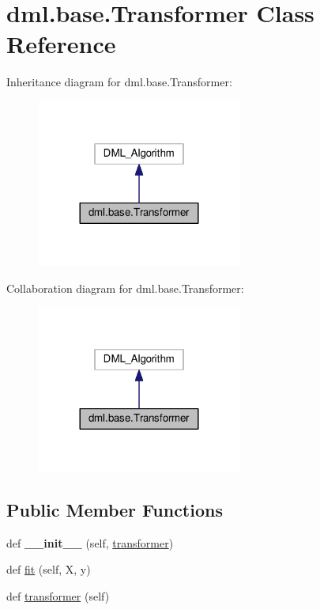 \hypertarget{classdml_1_1base_1_1Transformer}{}\section{dml.\+base.\+Transformer Class Reference}
\label{classdml_1_1base_1_1Transformer}


Inheritance diagram for dml.\+base.\+Transformer\+:\nopagebreak
\begin{figure}[H]
\begin{center}
\leavevmode
\includegraphics[width=192pt]{classdml_1_1base_1_1Transformer__inherit__graph}
\end{center}
\end{figure}


Collaboration diagram for dml.\+base.\+Transformer\+:\nopagebreak
\begin{figure}[H]
\begin{center}
\leavevmode
\includegraphics[width=192pt]{classdml_1_1base_1_1Transformer__coll__graph}
\end{center}
\end{figure}
\subsection*{Public Member Functions}
\begin{DoxyCompactItemize}
\item 
def {\bfseries \+\_\+\+\_\+init\+\_\+\+\_\+} (self, \hyperlink{classdml_1_1base_1_1Transformer_a141897f784dd19a70fa72f4154751881}{transformer})\hypertarget{classdml_1_1base_1_1Transformer_ac4abe61c0b5af45b0a11de4f872a6fc3}{}\label{classdml_1_1base_1_1Transformer_ac4abe61c0b5af45b0a11de4f872a6fc3}

\item 
def \hyperlink{classdml_1_1base_1_1Transformer_a13ce455fe423e55f0ffa41c47a080c55}{fit} (self, X, y)
\item 
def \hyperlink{classdml_1_1base_1_1Transformer_a141897f784dd19a70fa72f4154751881}{transformer} (self)
\end{DoxyCompactItemize}

